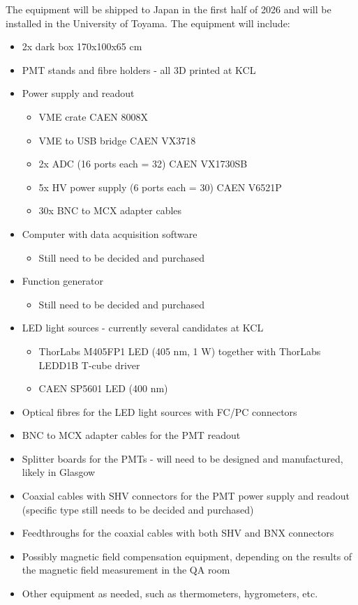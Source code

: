 \documentclass[12pt,a4paper]{article}
\begin{document}
The equipment will be shipped to Japan in the first half of 2026 and will be installed in the University of Toyama. The equipment will include:
\begin{itemize}
  \item 2x dark box 170x100x65 cm
  \item PMT stands and fibre holders - all 3D printed at KCL
  \item Power supply and readout
  \begin{itemize}
    \item VME crate CAEN 8008X
    \item VME to USB bridge CAEN VX3718
    \item 2x ADC (16 ports each = 32) CAEN VX1730SB
    \item 5x HV power supply (6 ports each = 30) CAEN V6521P
    \item 30x BNC to MCX adapter cables
  \end{itemize}
  \item Computer with data acquisition software
  \begin{itemize}
    \item Still need to be decided and purchased
  \end{itemize}
  \item Function generator
  \begin{itemize}
    \item Still need to be decided and purchased
  \end{itemize}
  \item LED light sources - currently several candidates at KCL
  \begin{itemize}
    \item ThorLabs M405FP1 LED (405 nm, 1 W) together with ThorLabs LEDD1B T-cube driver
    \item CAEN SP5601 LED (400 nm)
  \end{itemize}
  \item Optical fibres for the LED light sources with FC/PC connectors
  \item BNC to MCX adapter cables for the PMT readout
  \item Splitter boards for the PMTs - will need to be designed and manufactured, likely in Glasgow
  \item Coaxial cables with SHV connectors for the PMT power supply and readout (specific type still needs to be decided and purchased)
  \item Feedthroughs for the coaxial cables with both SHV and BNX connectors
  \item Possibly magnetic field compensation equipment, depending on the results of the magnetic field measurement in the QA room
  \item Other equipment as needed, such as thermometers, hygrometers, etc.
\end{itemize}
\end{document}
